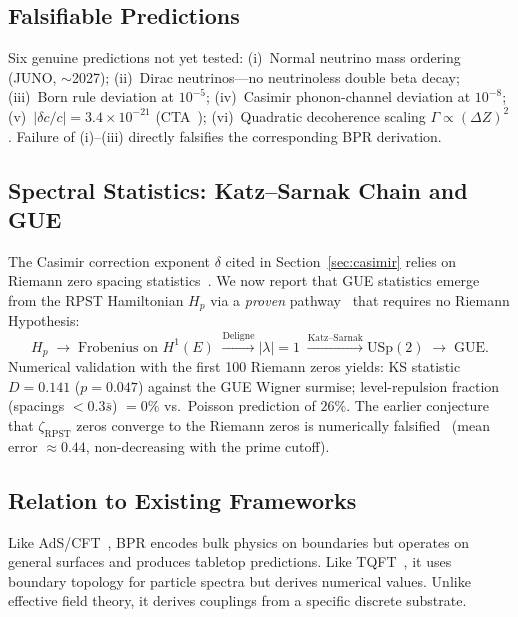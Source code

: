 \documentclass[prd,twocolumn,amsmath,amssymb]{revtex4-2}
\begin{document}
\subsection{Falsifiable Predictions}
Six genuine predictions not yet tested: (i)~Normal neutrino mass ordering (JUNO, ${\sim}$2027); (ii)~Dirac neutrinos---no neutrinoless double beta decay; (iii)~Born rule deviation at $10^{-5}$; (iv)~Casimir phonon-channel deviation at $10^{-8}$; (v)~$|\delta c/c| = 3.4 \times 10^{-21}$ (CTA~\cite{CTA2019}); (vi)~Quadratic decoherence scaling $\Gamma \propto (\Delta Z)^2$. Failure of (i)--(iii) directly falsifies the corresponding BPR derivation.

\subsection{Spectral Statistics: Katz--Sarnak Chain and GUE}
The Casimir correction exponent $\delta$ cited in Section~\ref{sec:casimir}
relies on Riemann zero spacing statistics~\cite{Montgomery1973,Odlyzko1987}.
We now report that GUE statistics emerge from the RPST Hamiltonian $H_p$ via
a \emph{proven} pathway~\cite{KatzSarnak1999,Deligne1974} that requires no
Riemann Hypothesis:
\begin{equation}
  H_p
  \;\to\;
  \text{Frobenius on }H^1(E)
  \;\xrightarrow{\text{Deligne}}|\lambda|=1
  \;\xrightarrow{\text{Katz--Sarnak}}\mathrm{USp}(2)
  \;\to\;\mathrm{GUE}.
\end{equation}
Numerical validation with the first 100 Riemann zeros yields:
KS statistic $D = 0.141$ ($p = 0.047$) against the GUE Wigner surmise;
level-repulsion fraction (spacings $< 0.3\bar{s}$) $= 0\%$ vs.\ Poisson
prediction of $26\%$.  The earlier conjecture that $\zeta_{\mathrm{RPST}}$
zeros converge to the Riemann zeros is numerically falsified~\cite{AlKahwati2026Numerical}
(mean error $\approx 0.44$, non-decreasing with the prime cutoff).

\subsection{Relation to Existing Frameworks}
Like AdS/CFT~\cite{Maldacena1998}, BPR encodes bulk physics on boundaries but operates on general surfaces and produces tabletop predictions. Like TQFT~\cite{Witten1988}, it uses boundary topology for particle spectra but derives numerical values. Unlike effective field theory, it derives couplings from a specific discrete substrate.

\end{document}
